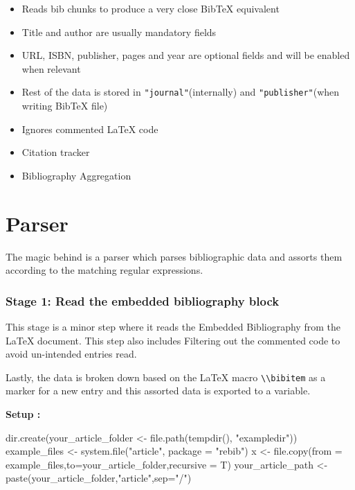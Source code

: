\begin{itemize}
  \item Reads bib chunks to produce a very close BibTeX equivalent
  \item Title and author are usually mandatory fields
  \item URL, ISBN, publisher, pages and year are optional fields and will be enabled when relevant
  \item Rest of the data is stored in \verb|"journal"|(internally) and \verb|"publisher"|(when writing BibTeX file)
  \item Ignores commented LaTeX code 
  \item Citation tracker
  \item Bibliography Aggregation
\end{itemize}

\section{Parser}

The magic behind  is a parser which parses bibliographic data and assorts them according to the matching regular expressions.

\subsubsection{Stage 1: Read the embedded bibliography block}

This stage is a minor step where it reads the Embedded Bibliography from the LaTeX document. This step also includes Filtering out the commented code to avoid un-intended entries read.

Lastly, the data is broken down based on the LaTeX macro \verb|\\bibitem| as a marker for a new entry and this assorted data is exported to a variable.


\begin{Schunk}
 
\textbf{Setup :}
\begin{Sinput}
dir.create(your_article_folder <- file.path(tempdir(), "exampledir"))
example_files <-  system.file("article", package = "rebib")
x <- file.copy(from = example_files,to=your_article_folder,recursive = T)
your_article_path <- paste(your_article_folder,"article",sep="/")
\end{Sinput}
\end{Schunk}

